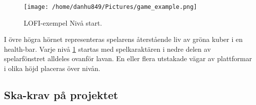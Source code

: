 \documentclass{TDP005mall}
\begin{document}
\begin{figure}[h!]
  \caption{LOFI-exempel Nivå start.\label{fig:4}}
  \centerline{\texttt{[image: /home/danhu849/Pictures/game\_example.png]}}  
\end{figure}

I övre högra hörnet representeras spelarens återstående liv av gröna kuber i en health-bar. Varje nivå \ref{fig:4} startas med spelkaraktären i nedre delen av spelarfönstret alldeles ovanför lavan. En eller flera utstakade vägar av plattformar i olika höjd placeras över nivån.

\subsection{Ska-krav på projektet} %
\end{document}
